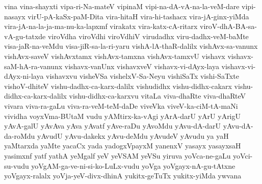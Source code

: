 {vina
vina-shayxti
vipa-ri-Na-mateV
vipinaM
vipi-na-dA-vA-na-la-veM-dare
vipi-nasayx
virU-pA-kaSx-paM-Dita
vira-hitaH
vira-hi-tashacx
vira-jA-ginx-yiMda
vira-jA-na-la-ja-ma-nu-ka-lapxmf
virakatx
vira-katx-cA-ritarx
viroV-dhA-BA-sa-vA-gu-tatxde
viroVdha
viroVdhi
viroVdhiV
virudadhx
viru-dadhx-veM-baMte
visa-jaR-na-veMdu
visa-jiR-sa-la-ri-yaru
vishA-lA-thaR-dalilx
vishAvx-sa-vanunx
vishAvx-saveV
vishAvxtamx
vishAvx-tamxna
vishAvx-tamxvU
vishavx
vishavx-saM-hA-ra-vanunx
vishavx-vanUnx
vishavxveV
vishavx-vi-dAyx-laya
vishavx-vi-dAyx-ni-laya
vishavxvu
visheVSa
vishelxV-Sa-Neyu
vishiSaTx
vishi-SaTxte
vishoV-dhiteV
vishu-dadhx-ca-karx-dalilx
vishudidhx
vishu-didhx-cakarx
vishu-didhx-ca-karx-dalilx
vishu-didhx-ca-karxvu
vitaLa
viva-dhaRte
viva-dhaRteV
vivara
viva-ra-gaLu
viva-ra-veM-teM-daDe
viveVka
viveV-ka-ciM-tA-maNi
vividha
voyxVma-BUtaM
vudu
yAMtirx-ka-vAgi
yArA-darU
yArU
yArigU
yAvA-galU
yAvAva
yAva
yAvatf
yAve-raDu
yAvoMdu
yAvu-dA-darU
yAvu-dA-da-roMdu
yAvudU
yAvu-dakekx
yAvu-deMdu
yAvudeV
yAvudu
ya
yaH
yaMtarxda
yaMte
yacaCx
yada
yadogxVpayxM
yanenxV
yasayx
yasayxsaH
yasimxnf
yatf
yathA
yeMgalf
yeV
yeVSAM
yeVSu
yiruva
yoVca-ne-gaLu
yoVci-su-vudu
yoVgAM-ga-ve-ni-si-ko-LuLx-vudu
yoVga
yoVgayx-nA-gu-tAtxne
yoVgayx-ralalx
yoVja-yeV-divx-dhinA
yukitx-geTuTx
yukitx-yiMda
ywvana
}
